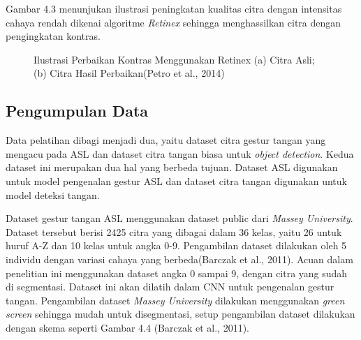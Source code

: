 \noindent Gambar 4.3 menunjukan ilustrasi peningkatan kualitas citra dengan intensitas cahaya rendah dikenai algoritme \emph{Retinex} sehingga menghassilkan citra dengan pengingkatan kontras.
\begin{figure}[H]
	\centering
	\caption{Ilustrasi Perbaikan Kontras Menggunakan Retinex (a) Citra Asli; (b) Citra Hasil Perbaikan(Petro et al., 2014)}
	\label{fig:ret1}
	\label{fig:ret2}
\end{figure}


\subsection{Pengumpulan Data}
Data pelatihan dibagi menjadi dua, yaitu dataset citra gestur tangan yang mengacu pada ASL dan dataset citra tangan biasa untuk \emph{object detection}.
Kedua dataset ini merupakan dua hal yang berbeda tujuan. 
Dataset ASL digunakan untuk model pengenalan gestur ASL dan dataset citra tangan digunakan untuk model deteksi tangan.

Dataset gestur tangan ASL menggunakan dataset public dari \emph{Massey University}. Dataset tersebut berisi 2425 citra yang dibagai dalam 36 kelas, yaitu 26 untuk huruf A-Z dan 10 kelas untuk angka 0-9. Pengambilan dataset dilakukan oleh 5 individu dengan variasi cahaya yang berbeda(Barczak et al., 2011).
Acuan dalam penelitian ini menggunakan dataset angka 0 sampai 9, dengan citra yang sudah di segmentasi.
Dataset ini akan dilatih dalam CNN untuk pengenalan gestur tangan.
Pengambilan dataset \emph{Massey University} dilakukan menggunakan \emph{green screen} sehingga mudah untuk disegmentasi, setup pengambilan dataset dilakukan dengan skema seperti Gambar 4.4 (Barczak et al., 2011).


